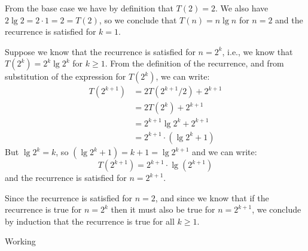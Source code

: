 \documentclass[a4paper,12pt]{article}
\begin{document}
From the base case we have by definition that $T(2) = 2$. We also have $2 \lg 2 = 2 \cdot 1 = 2 = T(2)$, so we conclude that $T(n) = n\lg n$ for $n=2$ and 
the recurrence is satisfied for $k=1$.

Suppose we know that the recurrence is satisfied for $n=2^k$, i.e., we know that $T(2^k) = 2^k \lg 2^k$ for $k \ge 1$. From the definition of the recurrence, 
and from substitution of the expression for $T(2^k)$, we can write:
\begin{equation}
\begin{split}
T(2^{k+1}) & = 2T(2^{k+1}/2) + 2^{k+1} \\
& = 2T(2^k) + 2^{k+1} \\
& = 2^{k+1} \lg 2^k + 2^{k+1} \\
& = 2^{k+1} \cdot (\lg 2^k + 1)
\end{split}
\end{equation}
But $\lg2^k = k$, so $(\lg 2^k + 1) = k+1 = \lg2^{k+1}$ and we can write:
\begin{equation}
T(2^{k+1}) = 2^{k+1} \cdot \lg(2^{k+1})
\end{equation}
and the recurrence is satisfied for $n=2^{k+1}$.

Since the recurrence is satisfied for $n=2$, and since we know that if the recurrence is true for $n=2^k$ then it must also be true for $n=2^{k+1}$, 
we conclude by induction that the recurrence is true for all $k \ge 1$.

\vspace{5mm}


Working

\vspace{5mm}

\end{document}
